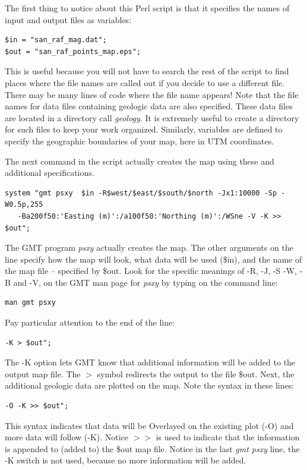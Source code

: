 \documentclass[letterpaper,10pt]{report}
\begin{document}
\vspace{2 mm}
The first thing to notice about this Perl script is that it specifies the names of input and output files as variables:
\begin{verbatim}
$in = "san_raf_mag.dat";
$out = "san_raf_points_map.eps";
\end{verbatim}
This is useful because you will not have to search the rest of the script to find places where the file names are called out if you decide to use a different file. There may be many lines of code where the file name appears! Note that the file names for data files containing geologic data are also specified. These data files are located in a directory call {\it geology}. It is extremely useful to create a directory for such files to keep your work organized. Similarly, variables are defined to specify the geographic boundaries of your map, here in UTM coordinates.

The next command in the script actually creates the map using these and additional specifications.
\begin{verbatim}
system "gmt psxy  $in -R$west/$east/$south/$north -Jx1:10000 -Sp -W0.5p,255
   -Ba200f50:'Easting (m)':/a100f50:'Northing (m)':/WSne -V -K >> $out";
\end{verbatim}
The GMT program {\it psxy} actually creates the map. The other arguments on the line specify how the map will look, what data will be used (\$in), and the name of the map file -- specified by \$out. Look for the specific meanings of -R, -J, -S -W, -B and -V, on the GMT man page for {\it psxy} by typing on the command line:
\begin{verbatim}
man gmt psxy
\end{verbatim}
Pay particular attention to the end of the line:
\begin{verbatim}
-K > $out";
\end{verbatim}
The -K option lets GMT know that additional information will be added to the output map file. The $>$ symbol redirects the output to the file \$out. Next, the additional geologic data are plotted on the map. Note the syntax in these lines:
\begin{verbatim}
-O -K >> $out";
\end{verbatim}
This syntax indicates that data will be Overlayed on the existing plot (-O) and more data will follow (-K). Notice $>>$ is used to indicate that the information is appended to (added to) the \$out map file. Notice in the last {\it gmt psxy} line, the -K switch is not used, because no more information will be added.
\end{document}
